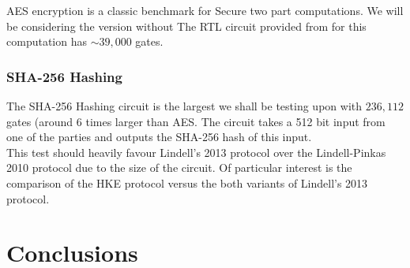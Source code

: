 \documentclass[ %
                    author={Nicholas Tutte},
                supervisor={Prof. Nigel Smart},
                    degree={MEng},
                     title={Secure Two Party Computation},
                  subtitle={A practical comparison of recent protocols},
                      type={Research - GG1K},
                      year={2015} ]{dissertation}
\begin{document}
				AES encryption is a classic benchmark for Secure two part computations. We will be considering the version without The RTL circuit provided from \cite{NigelCircuits} for this computation has $\sim 39,000$ gates.

			\subsection{SHA-256 Hashing}

				The SHA-256 Hashing circuit is the largest we shall be testing upon with $236,112$ gates (around 6 times larger than AES. The circuit takes a 512 bit input from one of the parties and outputs the SHA-256 hash of this input.\\

				This test should heavily favour Lindell's 2013 protocol over the Lindell-Pinkas 2010 protocol due to the size of the circuit. Of particular interest is the comparison of the HKE protocol versus the both variants of Lindell's 2013 protocol.\\

				


	\chapter{Conclusions}

		
\end{document}

